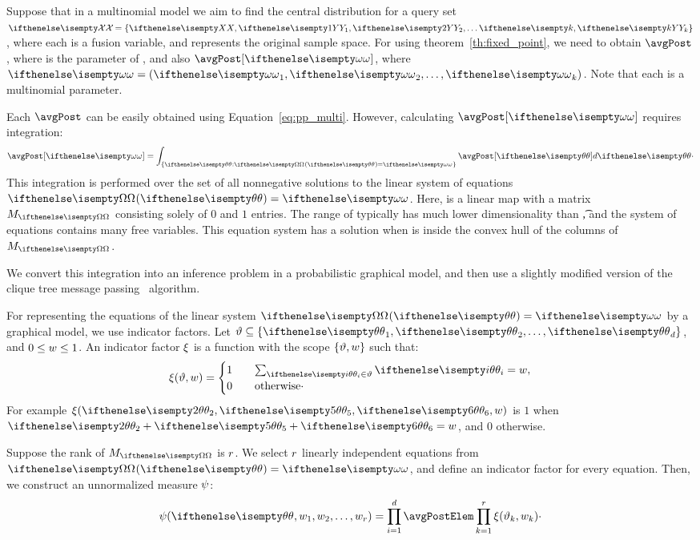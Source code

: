 Suppose that in a multinomial model we aim to find the central distribution for a query set
$\Qset = \{\X, \seqRv[Y]{k}\}$, where each \Y[i] is a fusion variable, and \X represents the original sample
space.
For using theorem~\ref{th:fixed_point}, we need to obtain $\avgPost$, where \w[i] is the parameter of \Y[i],
and also $\avgPost[\w]$, where $\w = \vSeq{\w}{k}$.
Note that each \w[i] is a multinomial parameter.

Each $\avgPost$ can be easily obtained using Equation~\ref{eq:pp_multi}.
However, calculating $\avgPost[\w]$ requires integration:
\[
    \avgPost[\w] = \int_{\omegaArea} \avgPost[\t] d\t \cdot
\]
This integration is performed over the set of all nonnegative solutions to the linear system of equations $\eqSys$.
Here, \W is a linear map with a matrix $\mat$ consisting solely of $0$ and $1$ entries.
The range of \W typically has much lower dimensionality than \t, and the system of equations contains
many free variables.
This equation system has a solution when \w is inside the convex hull of the columns of $\mat$.

We convert this integration into an inference problem in a probabilistic graphical model, and then use a slightly
modified version of the clique tree message passing~\cite{koller2009probabilistic} algorithm.

For representing the equations of the linear system $\eqSys$ by a graphical model, we use indicator factors.
Let $\eqScope \subseteq \{\seq{\t}{\mdim}\}$, and $0 \leq w \leq 1$.
An indicator factor $\xi$ is a function with the scope $\{\vartheta, w\}$ such that:
\[
    \ind(\eqScope, \omegaElem) = \begin{cases}
                                     1 \quad &  \sum_{\t[i] \in \eqScope} \t[i] = \omegaElem, \\
                                     0 & \text{otherwise} \cdot
    \end{cases}
\]
For example $\ind(\t[2], \t[5], \t[6], \omegaElem)$ is $1$ when $\t[2] + \t[5] + \t[6] = w$, and $0$ otherwise.

Suppose the rank of $\mat$ is $r$.
We select $r$ linearly independent equations from $\eqSys$, and define an indicator factor for every
equation.
Then, we construct an unnormalized measure $\psi$:
\begin{equation}
    \M(\t, \seq{\omegaElem}{\rankEqSys}) =
    \prodDim \avgPostElem \prod_{k = 1}^{\rankEqSys} \ind(\eqScope_k, \omegaElem_k) \cdot
    \label{eq:tree_measure}
\end{equation}

